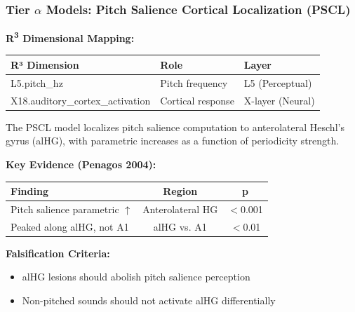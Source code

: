\documentclass[9pt,onecolumn]{article}
\newcommand{\Rthree}{R\textsuperscript{3}}
\begin{document}
\subsubsection{Tier $\alpha$ Models: Pitch Salience Cortical Localization (PSCL)}

\textbf{\Rthree{} Dimensional Mapping:}
\begin{center}
\small
\begin{tabular}{@{}lll@{}}
\toprule
\textbf{R³ Dimension} & \textbf{Role} & \textbf{Layer} \\
\midrule
L5.pitch\_hz & Pitch frequency & L5 (Perceptual) \\
X18.auditory\_cortex\_activation & Cortical response & X-layer (Neural) \\
\bottomrule
\end{tabular}
\end{center}

The PSCL model localizes pitch salience computation to anterolateral Heschl's gyrus (alHG), with parametric increases as a function of periodicity strength.

\textbf{Key Evidence (Penagos 2004):}
\begin{center}
\small
\begin{tabular}{@{}lcc@{}}
\toprule
\textbf{Finding} & \textbf{Region} & \textbf{p} \\
\midrule
Pitch salience parametric $\uparrow$ & Anterolateral HG & $<$0.001 \\
Peaked along alHG, not A1 & alHG vs. A1 & $<$0.01 \\
\bottomrule
\end{tabular}
\end{center}

\textbf{Falsification Criteria:}
\begin{itemize}[leftmargin=*, topsep=0pt, itemsep=0pt]
\item alHG lesions should abolish pitch salience perception
\item Non-pitched sounds should not activate alHG differentially
\end{itemize}
\end{document}
